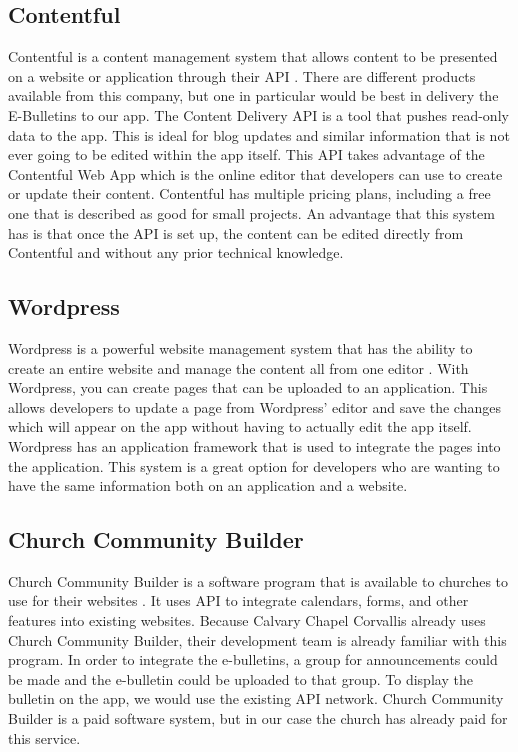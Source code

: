 \documentclass[letterpaper,10pt,draftclsnofoot,onecolumn,titlepage]{IEEEtran}
\begin{document}
	\subsection{Contentful}
	Contentful is a content management system that allows content to be presented on a website or application through their API \cite{Contentful}. 
	There are different products available from this company, but one in particular would be best in delivery the E-Bulletins to our app. 
	The Content Delivery API is a tool that pushes read-only data to the app. 
	This is ideal for blog updates and similar information that is not ever going to be edited within the app itself. 
	This API takes advantage of the Contentful Web App which is the online editor that developers can use to create or update their content. 
	Contentful has multiple pricing plans, including a free one that is described as good for small projects.
	An advantage that this system has is that once the API is set up, the content can be edited directly from Contentful and without any prior technical knowledge. 
	
	\subsection{Wordpress}
	Wordpress is a powerful website management system that has the ability to create an entire website and manage the content all from one editor \cite{Wordpress}. 
	With Wordpress, you can create pages that can be uploaded to an application.
	This allows developers to update a page from Wordpress' editor and save the changes which will appear on the app without having to actually edit the app itself. 
	Wordpress has an application framework that is used to integrate the pages into the application. 
	This system is a great option for developers who are wanting to have the same information both on an application and a website. 
	
	\subsection{Church Community Builder}
	Church Community Builder is a software program that is available to churches to use for their websites \cite{CCB}. 
	It uses API to integrate calendars, forms, and other features into existing websites. 
	Because Calvary Chapel Corvallis already uses Church Community Builder, their development team is already familiar with this program. 
	In order to integrate the e-bulletins, a group for announcements could be made and the e-bulletin could be uploaded to that group. 
	To display the bulletin on the app, we would use the existing API network. 
	Church Community Builder is a paid software system, but in our case the church has already paid for this service. 
	
\end{document}
